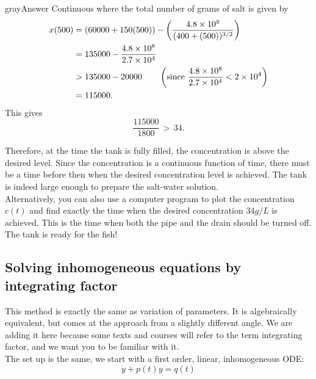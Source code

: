 \begin{mybox}{gray}{Answer Continuous}
  where the total number of grams of salt is given by
  \begin{align*}
    \displaystyle x(500) \displaystyle
    &= \displaystyle \left(60000+150(500)\right)-\left(\frac{4.8 \times 10^8}{(400+(500))^{3/2}}\right) \\
    \displaystyle &= \displaystyle 135000-\frac{4.8 \times 10^8}{2.7\times 10^4} \\
    \displaystyle &> \displaystyle 135000-20000\qquad
                    \left(\text {since}\, \,  \frac{4.8 \times 10^8}{2.7\times 10^4}<2\times 10^4\right) \\
    \displaystyle &= \displaystyle 115000.
  \end{align*}
  This gives
  \begin{equation*}
    \displaystyle \frac{115000}{1800}\, >\,  34.
  \end{equation*}

  Therefore, at the time the tank is fully filled, the concentration is above the desired level.
  Since the concentration is a continuous function of time,
  there must be a time before then when the desired concentration level is achieved.
  The tank is indeed large enough to prepare the salt-water solution.\\

  \Remark Alternatively, you can also use a computer program to plot the concentration
  $c(t)$ and find exactly the time when the desired concentration $34 g/L$ is achieved.
  This is the time when both the pipe and the drain should be turned off.
  The tank is ready for the fish!
\end{mybox}

\clearpage
\subsection{Solving inhomogeneous equations by integrating factor}

This method is exactly the same as variation of parameters.
It is algebraically equivalent, but comes at the approach from a slightly different angle.
We are adding it here because some texts and courses will refer to the term integrating factor, and we want you to be familiar with it.\\

The set up is the same, we start with a first order, linear, inhomogeneous ODE:
\begin{equation*}
  \dot{y} + p(t) y = q(t)
\end{equation*}


